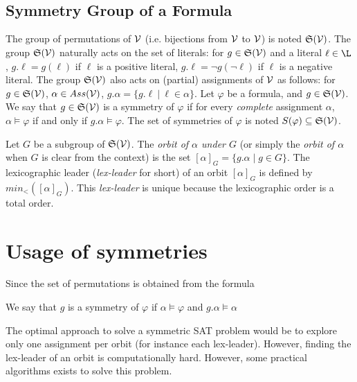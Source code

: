 \\
\\



\subsection{Symmetry Group of a Formula}

The group of permutations of $\mathcal{V}$ (i.e. bijections from $\mathcal{V}$ to $\mathcal{V}$) is noted
$\mathfrak{S}(\mathcal{V})$. The group $\mathfrak{S}(\mathcal{V})$ naturally acts on the set of literals: for $g
\in \mathfrak{S}(\mathcal{V})$ and a literal $\ell \in \L $, $g.\ell = g(\ell)$ if $\ell$ is a
positive literal, $g.\ell = \neg g(\neg \ell)$ if $\ell$ is a negative literal.
The group $\mathfrak{S}(\mathcal{V})$ also acts on (partial) assignments of $\mathcal{V}$ as follows: for
$g \in \mathfrak{S}(\mathcal{V})$, $\alpha \in Ass(\mathcal{V})$, $g.\alpha = \{ g.\ell ~|~ \ell \in \alpha \}$. Let
$\varphi$ be a formula, and $g \in \mathfrak{S}(\mathcal{V})$. We say that $g\in \mathfrak{S}(\mathcal{V})$ is a
symmetry of $ \varphi$ if for every \emph{complete} assignment $\alpha$, $\alpha
\models \varphi$ if and only if $g.\alpha \models \varphi$. The set of symmetries
of $\varphi$ is noted $S(\varphi) \subseteq \mathfrak{S}(\mathcal{V})$.

Let $G$ be a subgroup of $\mathfrak{S}(\mathcal{V})$. The \emph{orbit of $\alpha$ under $G$} (or
simply the \emph{orbit of $\alpha$} when $G$ is clear from the context) is the set
$ [\alpha]_G=\{ g.\alpha \mid g \in G \}$. The lexicographic leader
(\textit{lex-leader} for short) of an orbit $[\alpha]_G$ is defined by
$min_<([\alpha]_G)$. This \textit{lex-leader} is unique because the lexicographic
order is a total order.


\section{Usage of symmetries}

Since the set of permutations is obtained from the formula

We say that $g$ is a symmetry of $\varphi$ if $\alpha \models \varphi$ and $ g.\alpha \models \alpha$


The optimal approach to solve a symmetric SAT problem would be to explore
only one assignment per orbit (for instance each lex-leader). However, finding the
lex-leader of an orbit is computationally hard. 
However, some practical algorithms exists to solve this problem.


